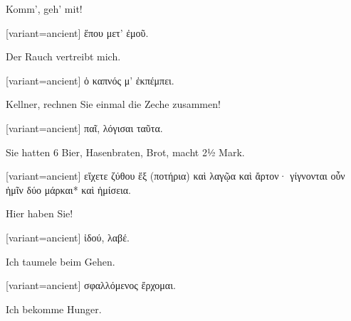 Komm', geh' mit!

\switchcolumn

\begin{greek}[variant=ancient]%
ἕπου μετ' ἐμοῦ.

\end{greek}%
\switchcolumn*

Der Rauch vertreibt mich.

\switchcolumn

\begin{greek}[variant=ancient]%
ὁ καπνός μ' ἐκπέμπει.

\end{greek}%
\switchcolumn*

Kellner, rechnen Sie einmal die Zeche zusammen!

\switchcolumn

\begin{greek}[variant=ancient]%
παῖ, λόγισαι ταῦτα.

\end{greek}%
\switchcolumn*

Sie hatten 6 Bier, Hasenbraten, Brot, macht 2½ Mark.

\switchcolumn

\begin{greek}[variant=ancient]%
εἴχετε ζύθου ἕξ (ποτήρια) καὶ λαγῷα καὶ ἄρτον· γίγνονται οὖν ἡμῖν
δύο μάρκαι{*} καὶ ἡμίσεια.

\end{greek}%
\switchcolumn*

Hier haben Sie!

\switchcolumn

\begin{greek}[variant=ancient]%
ἰδού, λαβέ.

\end{greek}%
\switchcolumn*

Ich taumele beim Gehen.

\switchcolumn

\begin{greek}[variant=ancient]%
σφαλλόμενος ἔρχομαι.

\end{greek}%
\indent Ich bekomme Hunger.

\switchcolumn

